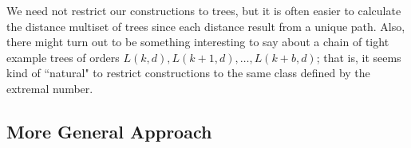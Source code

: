 \documentclass[12]{article}
\DeclareMathOperator{\diam}{Diam}
\DeclareMathOperator{\mult}{mult}
\theoremstyle{definition}
\begin{document}

	We need not restrict our constructions to trees, but it is often easier to calculate the distance multiset of trees since each distance result from a unique path.  Also, there might turn out to be something interesting to say about a chain of tight example trees of orders $L(k,d), L(k+1,d), \ldots, L(k+b,d)$; that is, it seems kind of ``natural" to restrict constructions to the same class defined by the extremal number.
	
	
	
	
	\subsection{More General Approach}
	
\end{document}
